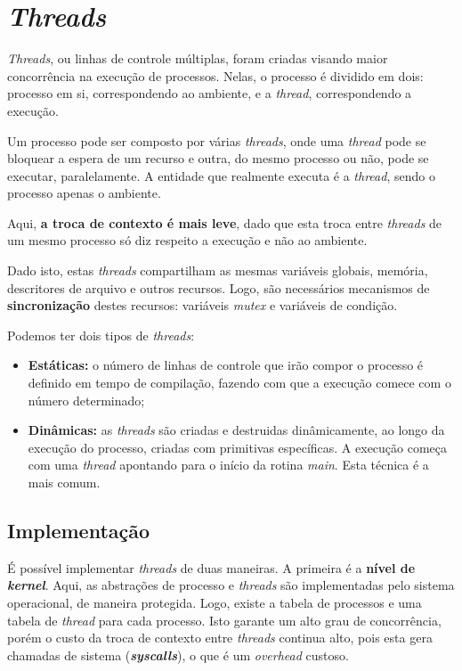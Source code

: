\section{\textit{Threads}}
\textit{Threads}, ou linhas de controle múltiplas, foram criadas visando maior concorrência na execução de processos. Nelas, o processo é dividido em dois: processo em si, correspondendo ao ambiente, e a \textit{thread}, correspondendo a execução.

Um processo pode ser composto por várias \textit{threads}, onde uma \textit{thread} pode se bloquear a espera de um recurso e outra, do mesmo processo ou não, pode se executar, paralelamente. A entidade que realmente executa é a \textit{thread}, sendo o processo apenas o ambiente.


Aqui, \textbf{a troca de contexto é mais leve}, dado que esta troca entre \textit{threads} de um mesmo processo só diz respeito a execução e não ao ambiente.

Dado isto, estas \textit{threads} compartilham as mesmas variáveis globais, memória, descritores de arquivo e outros recursos. Logo, são necessários mecanismos de \textbf{sincronização} destes recursos: variáveis \textit{mutex} e variáveis de condição.

Podemos ter dois tipos de \textit{threads}:
\begin{itemize}
  \item \textbf{Estáticas:} o número de linhas de controle que irão compor o processo é definido em tempo de compilação, fazendo com que a execução comece com o número determinado;

  \item \textbf{Dinâmicas:} as \textit{threads} são criadas e destruidas dinâmicamente, ao longo da execução do processo, criadas com primitivas específicas. A execução começa com uma \textit{thread} apontando para o início da rotina \textit{main}. Esta técnica é a mais comum.
\end{itemize}






\subsection{Implementação}
É possível implementar \textit{threads} de duas maneiras. A primeira é a \textbf{nível de \textit{kernel}}. Aqui, as abstrações de processo e \textit{threads} são implementadas pelo sistema operacional, de maneira protegida. Logo, existe a tabela de processos e uma tabela de \textit{thread} para cada processo. Isto garante um alto grau de concorrência, porém o custo da troca de contexto entre \textit{threads} continua alto, pois esta gera chamadas de sistema (\textbf{\textit{syscalls}}), o que é um \textit{overhead} custoso.

